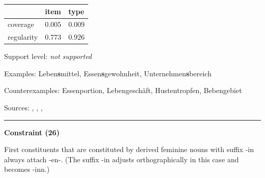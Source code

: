 \begin{table}[!ht]
\begin{center}
\setlength{\extrarowheight}{1pt}
\begin{tabularx}{\columnwidth}{|X|X|X|}
\hline
 & item & type \\
\hline
 coverage & $0.005$ & $0.009$ \\
\hline
 regularity & $0.773$ & $0.926$ \\
\hline
\end{tabularx}
\end{center}
\end{table}

\vspace{-1.35em}

\noindent
Support level: \textit{not supported}

\vspace{0.3em}

\noindent
Examples: Leben\textbf{s}mittel, Essen\textbf{s}gewohnheit, Unternehmen\textbf{s}bereich

\noindent
Counterexamples: Essen{\zeroLinker}portion, Leben{\zeroLinker}geschäft, Husten{\zeroLinker}tropfen, Beben{\zeroLinker}gebiet

\vspace{0.3em}

\noindent
Sources: \citet[230]{eisenberg_2013}, \citet[107]{kuerschner_2005}, \citet[78]{nuebling_szczepaniak_2013}, \citet[89]{ortner_mueller-bollhagen_1991}

\vspace{0.35em}
\hrule




\vspace{0.4em}

\begin{center}
\textbf{Constraint (26)}
\end{center}

\noindent
First constituents that are constituted by derived feminine nouns with suffix -in always attach -en-. (The suffix -in adjusts orthographically in this case and becomes -inn.)
\vspace{0.5em}


